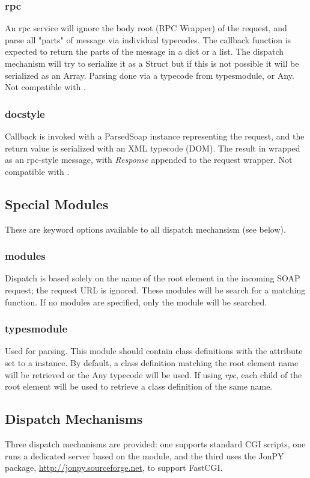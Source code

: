 \subsubsection{rpc} An rpc service will ignore the body root (RPC Wrapper) of
the request, and parse all "parts" of message via individual typecodes.  The
callback function is expected to return the parts of the message in a dict or a
list.  The dispatch mechanism will try to serialize it as a Struct but if this
is not possible it will be serialized as an Array. Parsing done via a typecode
from typesmodule, or Any.  Not compatible with .

\subsubsection{docstyle}  Callback is invoked with a ParsedSoap instance
representing the request, and the return value is serialized with an XML
typecode (DOM).  The result in wrapped as an rpc-style message, with 
\emph{Response} appended to the request wrapper.  Not compatible with .

\subsection{Special Modules}  These are keyword options available to all
dispatch mechansism (see below).

\subsubsection{modules}{Dispatch is based solely on the name of the root element in the
incoming SOAP request; the request URL is ignored.  These modules will be search
for a matching function.  If no modules are specified, only the 
 module will be searched.}

\subsubsection{typesmodule}{Used for parsing.  This module should contain class 
definitions with the  attribute set to a 
instance.  By default, a class definition matching the root element name will be
retrieved or the Any typecode will be used.  If using \emph{rpc}, each child of
the root element will be used to retrieve a class definition of the same name.}

\subsection{Dispatch Mechanisms}
Three dispatch mechanisms are provided: one supports standard CGI
scripts, one runs a dedicated server based on the
 module, and the third uses the JonPY package,
\url{http://jonpy.sourceforge.net}, to support FastCGI.

